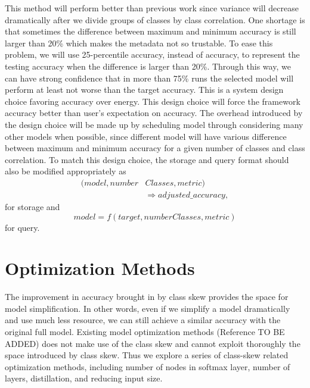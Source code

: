 \documentclass[conference]{IEEEtran}
\begin{document}
\begin{spacing}{0.9}
This method will perform better than previous work since variance will decrease dramatically after we divide groups of classes by class correlation. One shortage is that sometimes the difference between maximum and minimum accuracy is still larger than 20\% which makes the metadata not so trustable. To ease this problem, we will use 25-percentile accuracy, instead of accuracy, to represent the testing accuracy when the difference is larger than 20\%. Through this way, we can have strong confidence that in more than 75\% runs the selected model will perform at least not worse than the target accuracy. This is a system design choice favoring accuracy over energy. This design choice will force the framework accuracy better than user's expectation on accuracy. The overhead introduced by the design choice will be made up by scheduling model through considering many other models when possible, since different model will have various difference between maximum and minimum accuracy for a given number of classes and class correlation. To match this design choice, the storage and query format should also be modified appropriately as
\begin{equation}
    \begin{split}
        (model, number&Classes, metric) \\
            & \Longrightarrow adjusted\_accuracy,
    \end{split}
\end{equation}
for storage and
\begin{equation}
    model = f(target, numberClasses, metric)
\end{equation}
for query.

\section{Optimization Methods}
The improvement in accuracy brought in by class skew provides the space for model simplification. In other words, even if we simplify a model dramatically and use much less resource, we can still achieve a similar accuracy with the original full model. Existing model optimization methods (Reference TO BE ADDED) does not make use of the class skew and cannot exploit thoroughly the space introduced by class skew. Thus we explore a series of class-skew related optimization methods, including number of nodes in softmax layer, number of layers, distillation, and reducing input size. 


\end{spacing}
\end{document}
